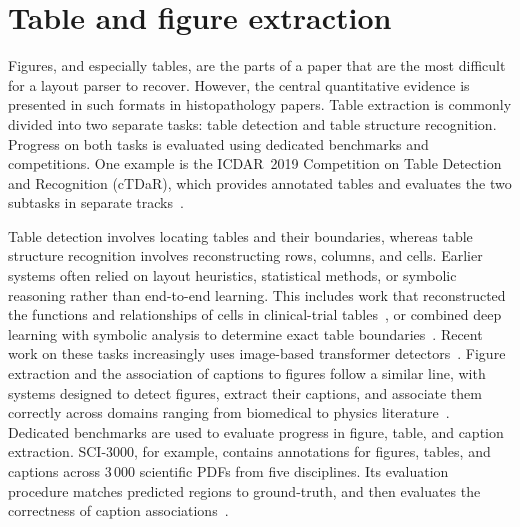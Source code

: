 \section{Table and figure extraction}\label{section:background-table-and-figure-extraction}

Figures, and especially tables, are the parts of a paper that are the most difficult for a layout parser to recover. However, the central quantitative evidence is presented in such formats in histopathology papers. Table extraction is commonly divided into two separate tasks: table detection and table structure recognition. Progress on both tasks is evaluated using dedicated benchmarks and competitions. One example is the ICDAR~2019 Competition on Table Detection and Recognition (cTDaR), which provides annotated tables and evaluates the two subtasks in separate tracks~\parencite{gao2019icdar2019competition}.

Table detection involves locating tables and their boundaries, whereas table structure recognition involves reconstructing rows, columns, and cells. Earlier systems often relied on layout heuristics, statistical methods, or symbolic reasoning rather than end-to-end learning. This includes work that reconstructed the functions and relationships of cells in clinical-trial tables~\parencite{milosevic2016disentanglingstructuretables}, or combined deep learning with symbolic analysis to determine exact table boundaries~\parencite{zhang2021integratedapproachdeep}. Recent work on these tasks increasingly uses image-based transformer detectors~\parencite{smock2022pubtables1mcomprehensivetable, smock2025pubtablesv2newlargescale}. Figure extraction and the association of captions to figures follow a similar line, with systems designed to detect figures, extract their captions, and associate them correctly across domains ranging from biomedical to physics literature~\parencite{clark2015extractingfigurestables, lopez2011automaticsystemextracting, praczyk2013automaticextractionfigures, raychoudhury2015automaticextractionfigures, siegel2018extractingscientificfigures, li2019figurecaptionextraction, chaki2023automaticsystemextracting}. Dedicated benchmarks are used to evaluate progress in figure, table, and caption extraction. SCI-3000, for example, contains annotations for figures, tables, and captions across 3\,000 scientific PDFs from five disciplines. Its evaluation procedure matches predicted regions to ground-truth, and then evaluates the correctness of caption associations~\parencite{darmanovic2023sci3000datasetfigure}.

